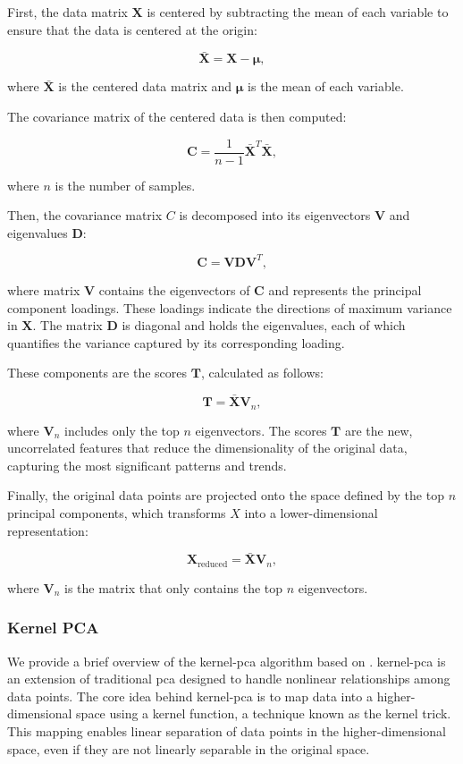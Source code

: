 First, the data matrix $\mathbf{X}$ is centered by subtracting the mean of each variable to ensure that the data is centered at the origin:

$$
\mathbf{\bar{X}} = \mathbf{X} - \mathbf{\mu},
$$

where $\mathbf{\bar{X}}$ is the centered data matrix and $\mathbf{\mu}$ is the mean of each variable.

The covariance matrix of the centered data is then computed:

$$
\mathbf{C} = \frac{1}{n-1} \mathbf{\bar{X}}^T \mathbf{\bar{X}},
$$

where $n$ is the number of samples.

Then, the covariance matrix $C$ is decomposed into its eigenvectors $\mathbf{V}$ and eigenvalues $\mathbf{D}$:

$$
\mathbf{C} = \mathbf{V} \mathbf{D} \mathbf{V}^T,
$$

where matrix $\mathbf{V}$ contains the eigenvectors of $\mathbf{C}$ and represents the principal component loadings.
These loadings indicate the directions of maximum variance in $\mathbf{X}$.
The matrix $\mathbf{D}$ is diagonal and holds the eigenvalues, each of which quantifies the variance captured by its corresponding loading.

These components are the scores $\mathbf{T}$, calculated as follows:

$$
\mathbf{T} = \mathbf{\bar{X}} \mathbf{V}_n,
$$

where $\mathbf{V}_n$ includes only the top $n$ eigenvectors.
The scores $\mathbf{T}$ are the new, uncorrelated features that reduce the dimensionality of the original data, capturing the most significant patterns and trends.

Finally, the original data points are projected onto the space defined by the top $n$ principal components, which transforms $X$ into a lower-dimensional representation:

$$
\mathbf{X}_{\text{reduced}} = \mathbf{\bar{X}} \mathbf{V}_n,
$$

where $\mathbf{V}_n$ is the matrix that only contains the top $n$ eigenvectors.

\subsubsection{Kernel PCA}
We provide a brief overview of the \gls{kernel-pca} algorithm based on \citet{learningwithkernels}.
\gls{kernel-pca} is an extension of traditional \gls{pca} designed to handle nonlinear relationships among data points.
The core idea behind \gls{kernel-pca} is to map data into a higher-dimensional space using a kernel function, a technique known as the kernel trick.
This mapping enables linear separation of data points in the higher-dimensional space, even if they are not linearly separable in the original space.

